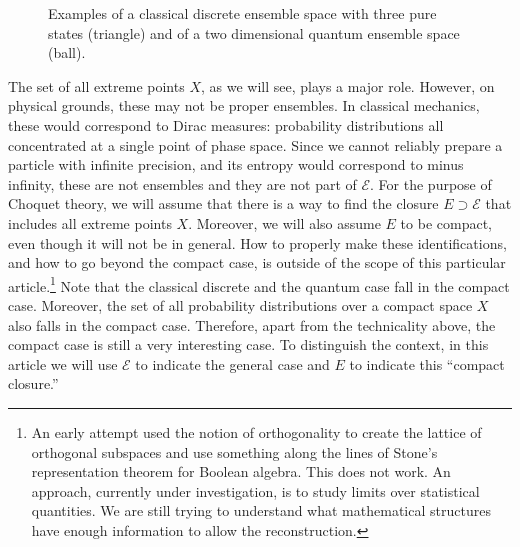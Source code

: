 \documentclass[10pt,twocolumn, nofootinbib]{revtex4-2}
\newcommand{\Ens}[1][E] {\mathcal{#1}} %
\begin{document}
\begin{figure}[H]
	\caption{Examples of a classical discrete ensemble space with three pure states (triangle) and of a two dimensional quantum ensemble space (ball).}
\end{figure}

The set of all extreme points $X$, as we will see, plays a major role. However, on physical grounds, these may not be proper ensembles. In classical mechanics, these would correspond to Dirac measures: probability distributions all concentrated at a single point of phase space. Since we cannot reliably prepare a particle with infinite precision, and its entropy would correspond to minus infinity, these are not ensembles and they are not part of $\Ens$. For the purpose of Choquet theory, we will assume that there is a way to find the closure $E \supset \Ens$ that includes all extreme points $X$. Moreover, we will also assume $E$ to be compact, even though it will not be in general. How to properly make these identifications, and how to go beyond the compact case, is outside of the scope of this particular article.\footnote{An early attempt used the notion of orthogonality to create the lattice of orthogonal subspaces and use something along the lines of Stone's representation theorem for Boolean algebra. This does not work. An approach, currently under investigation, is to study limits over statistical quantities. We are still trying to understand what mathematical structures have enough information to allow the reconstruction.} Note that the classical discrete and the quantum case fall in the compact case. Moreover, the set of all probability distributions over a compact space $X$ also falls in the compact case. Therefore, apart from the technicality above, the compact case is still a very interesting case. To distinguish the context, in this article we will use $\Ens$ to indicate the general case and $E$ to indicate this ``compact closure.''
\end{document}
